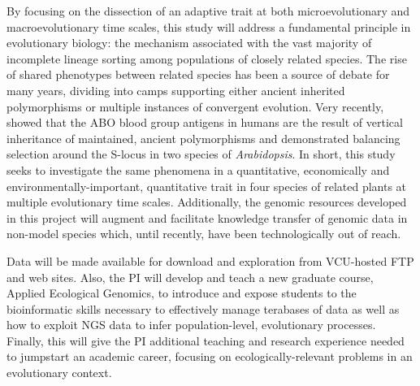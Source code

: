 By focusing on the dissection of an adaptive trait at both microevolutionary and macroevolutionary 
time scales, this study will address a fundamental principle in evolutionary biology: the mechanism 
associated with the vast majority of incomplete lineage sorting among populations of closely related species.  
The rise of shared phenotypes between related species has been a source of debate for many years, dividing 
into camps supporting either ancient inherited polymorphisms or multiple instances of convergent evolution.  Very recently, 
\citet{Segurel:vf} showed that the ABO blood group antigens in humans are the result of vertical inheritance 
of maintained, ancient polymorphisms and \citet{Roux:2012eb} demonstrated balancing selection around the S-locus in two 
species of  \emph{Arabidopsis}.  
In short, this study seeks to investigate the same phenomena in a quantitative, economically and 
environmentally-important, quantitative trait in four species of related plants at multiple evolutionary time scales.  Additionally, 
the genomic resources developed in this project will augment and facilitate knowledge transfer of genomic data in non-model 
species which, until recently, have been technologically out of reach.



Data will be made available for download and exploration from VCU-hosted FTP and web sites.  Also, the PI will develop and teach a new 
graduate course, Applied Ecological Genomics, to introduce and expose students to the bioinformatic skills necessary 
to effectively manage terabases of data as well as how to exploit NGS data to infer population-level, evolutionary processes.   
Finally, this will give the PI additional teaching and research experience needed to jumpstart an academic career, focusing on 
ecologically-relevant problems in an evolutionary context.

